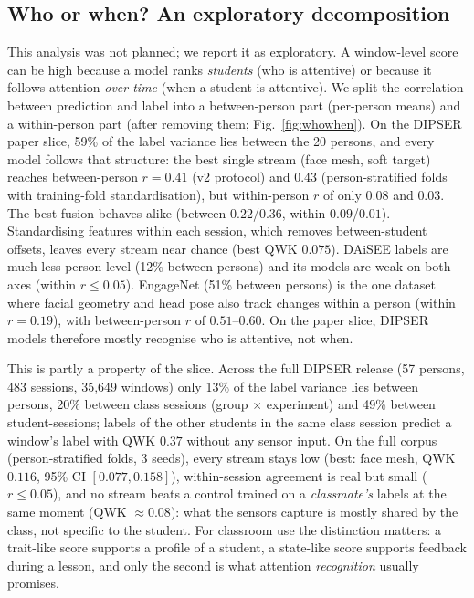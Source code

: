 
\subsection{Who or when? An exploratory decomposition}
\label{sec:whowhen}
This analysis was not planned; we report it as exploratory. A window-level score can be high because a model ranks \emph{students} (who is attentive) or because it follows attention \emph{over time} (when a student is attentive). We split the correlation between prediction and label into a between-person part (per-person means) and a within-person part (after removing them; Fig.~\ref{fig:whowhen}). On the DIPSER paper slice, 59\% of the label variance lies between the 20 persons, and every model follows that structure: the best single stream (face mesh, soft target) reaches between-person $r=0.41$ (v2 protocol) and $0.43$ (person-stratified folds with training-fold standardisation), but within-person $r$ of only $0.08$ and $0.03$. The best fusion behaves alike (between $0.22$/$0.36$, within $0.09$/$0.01$). Standardising features within each session, which removes between-student offsets, leaves every stream near chance (best QWK $0.075$). DAiSEE labels are much less person-level (12\% between persons) and its models are weak on both axes (within $r\le 0.05$). EngageNet (51\% between persons) is the one dataset where facial geometry and head pose also track changes within a person (within $r=0.19$), with between-person $r$ of $0.51$--$0.60$. On the paper slice, DIPSER models therefore mostly recognise who is attentive, not when.

This is partly a property of the slice. Across the full DIPSER release (57 persons, 483 sessions, 35{,}649 windows) only 13\% of the label variance lies between persons, 20\% between class sessions (group $\times$ experiment) and 49\% between student-sessions; labels of the other students in the same class session predict a window's label with QWK $0.37$ without any sensor input. On the full corpus (person-stratified folds, 3 seeds), every stream stays low (best: face mesh, QWK $0.116$, 95\% CI $[0.077, 0.158]$), within-session agreement is real but small ($r\le 0.05$), and no stream beats a control trained on a \emph{classmate's} labels at the same moment (QWK $\approx 0.08$): what the sensors capture is mostly shared by the class, not specific to the student. For classroom use the distinction matters: a trait-like score supports a profile of a student, a state-like score supports feedback during a lesson, and only the second is what attention \emph{recognition} usually promises.

